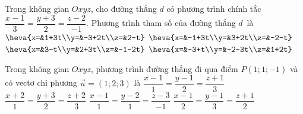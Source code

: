 

\begin{ex}%
	Trong không gian $ Oxyz$, cho đường  thẳng $d$ có phương trình chính tắc $\dfrac{x-1}{3}=\dfrac{y+3}{2}=\dfrac{z-2}{-1}$. Phương trình tham số của đường thẳng $d$~là
	 \choice
		 {\True $\heva{x=&1+3t\\y=&-3+2t\\z=&2-t}$}
		 {$\heva{x=&-1+3t\\y=&3+2t\\z=&-2-t}$}
		{$\heva{x=&3-t\\y=&2+3t\\z=&-1-2t}$} 
		 {$\heva{x=&-3+t\\y=&-2-3t\\z=&1+2t}$}
\end{ex}

\begin{ex}%
	Trong  không gian $Oxyz$, phương trình đường thẳng đi qua điểm $P(1; 1;-1)$ và có vectơ chỉ phương $\overrightarrow{u}=(1; 2; 3)$ là
	 \choice
		{\True $\dfrac{x-1}{1}=\dfrac{y-1}{2}=\dfrac{z+1}{3}$} 
		 {$\dfrac{x+2}{1}=\dfrac{y+3}{2}=\dfrac{z+2}{3}$}
		 {$\dfrac{x-1}{1}=\dfrac{y-2}{1}=\dfrac{z-3}{-1}$}
		 {$\dfrac{x-1}{2}=\dfrac{y-1}{3}=\dfrac{z+1}{2}$}
\end{ex}

